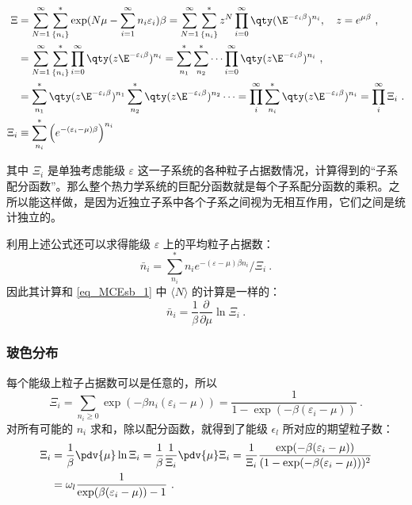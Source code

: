 \begin{equation}
\begin{aligned}
\Xi & = \sum_{N=1}^\infty  \sum_{\{n_i\}}^*  \exp(N\mu  - \sum_{i=1}^\infty n_i \varepsilon_i)\beta
= \sum_{N=1}^\infty  \sum_{\{n_i\}}^* z^N \prod_{i=0}^\infty \qty(\E^{-\varepsilon_i\beta})^{n_i}
,\quad z=e^{\mu\beta}~,
\\
&= \sum_{N=1}^\infty \sum_{\{n_i\}}^* \prod_{i=0}^\infty \qty(z \E^{-\varepsilon_i \beta})^{n_i}
= \sum_{n_1}^* \sum_{n_2}^* \dots \prod_{i=0}^\infty \qty(z \E^{-\varepsilon_i \beta})^{n_i}
~,
\\
&= \sum_{n_1}^* \qty(z \E^{-\varepsilon_i\beta})^{n_1} \sum_{n_2}^* \qty(z \E^{ -\varepsilon_i\beta})^{n_2}\dots
= \prod_i^\infty \sum_{n_i}^* \qty(z \E^{-\varepsilon_i \beta })^{n_i}=\prod_i^\infty \Xi_i~.\\
\Xi_i&\equiv \sum_{n_i}^* \left(e^{-(\varepsilon_i-\mu)\beta}\right)^{n_i}
\end{aligned}
\end{equation}

其中 $\Xi_i$ 是单独考虑能级 $\varepsilon$ 这一子系统的各种粒子占据数情况，计算得到的“子系配分函数”。那么整个热力学系统的巨配分函数就是每个子系配分函数的乘积。之所以能这样做，是因为近独立子系中各个子系之间视为无相互作用，它们之间是统计独立的。

利用上述公式还可以求得能级 $\varepsilon$ 上的平均粒子占据数：
\begin{equation}
\bar n_i = \sum_{n_i}^* n_i e^{-(\varepsilon-\mu)\beta n_i}/\Xi_i~.
\end{equation}
因此其计算和 \autoref{eq_MCEsb_1} 中 $\langle N\rangle$ 的计算是一样的：
\begin{equation}
\bar n_i = \frac{1}{\beta} \frac{\partial}{\partial \mu}\ln \Xi_i~.
\end{equation}
\subsubsection{玻色分布}
每个能级上粒子占据数可以是任意的，所以
\begin{equation}
\Xi_i=\sum_{n_i\ge 0} \exp(-\beta n_i(\varepsilon_i-\mu))=\frac{1}{1-\exp(-\beta(\varepsilon_i-\mu))}~.
\end{equation}
对所有可能的 $n_i$ 求和，除以配分函数，就得到了能级 $\epsilon_l$ 所对应的期望粒子数：
\begin{equation}
\begin{aligned}
\Xi_i&=\frac{1}{\beta}\pdv{\mu} \ln \Xi_i = \frac{1}{\beta} \frac{1}{\Xi_i} \pdv{\mu}\Xi_i=\frac{1}{\Xi_i}\frac{\exp(-\beta(\varepsilon_i-\mu))}{(1-\exp(-\beta(\varepsilon_i-\mu)))^2}\\
&=\omega_l \frac{1}{\exp(\beta(\varepsilon_i-\mu))-1}~.
\end{aligned}
\end{equation}
